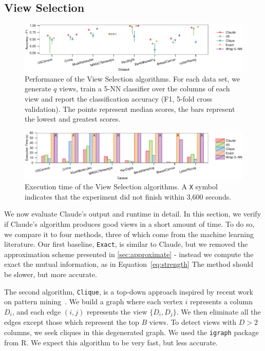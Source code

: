 \subsection{View Selection}
\label{sec:exp-view-selection}
\begin{figure}[t!]
\centering
\includegraphics[width=1.75\columnwidth]{plots/view-scores}
\caption{Performance of the View Selection algorithms. For each data set, we
    generate $q$ views, train a 5-NN classifier over the columns of each view
    and report the classification accuracy (F1, 5-fold cross validation). The
    points represent median scores, the bars represent the lowest and greatest
    scores.} 
\label{pic:column-select-score}
\end{figure}
\begin{figure}[t!]
\centering
\includegraphics[width=1.75\columnwidth]{plots/view-times}
\caption{Execution time of the View Selection algorithms. A \texttt{X} symbol
indicates that the experiment did not finish within 3,600 seconds.}
\label{pic:column-select-time}
\end{figure} 
We now evaluate Claude's output and runtime in detail. In this section, we
verify if Claude's algorithm produces good views in a short amount of time. To
do so, we compare it to four methods, three of which come from the machine
learning literature.  Our first baseline, \texttt{Exact}, is similar to
Claude, but we removed the approximation scheme presented in
\ref{sec:approximate} - instead we compute the exact the mutual information, as
in Equation~\ref{eq:strength} The method should be slower, but more accurate. 

The second algorithm, \texttt{Clique}, is a top-down approach inspired by
recent work on pattern mining~\cite{xie2010max}. We build a graph where each
vertex $i$ represents a column $D_i$, and each edge $(i,j)$ represents the view
$\{D_i, D_j\}$. We then eliminate all the edges except those which represent
the top $B$ views. To detect views with $D>2$ columns, we seek cliques in this
degenerated graph. We used the \texttt{igraph} package from R. We expect this
algorithm to be very fast, but less accurate.

